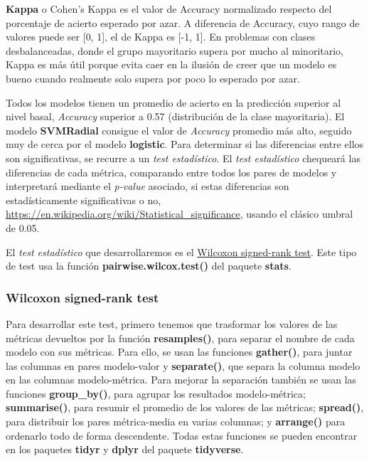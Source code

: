 \documentclass[]{article}
\begin{document}
\begin{tcolorbox}
	\textbf{Kappa} o Cohen's Kappa es el valor de Accuracy normalizado respecto
	del porcentaje de acierto esperado por azar. A diferencia de Accuracy,
	cuyo rango de valores puede ser {[}0, 1{]}, el de Kappa es {[}-1, 1{]}.
	En problemas con clases desbalanceadas, donde el grupo mayoritario
	supera por mucho al minoritario, Kappa es más útil porque evita caer en la
	ilusión de creer que un modelo es bueno cuando realmente solo supera por
	poco lo esperado por azar.
\end{tcolorbox}

Todos los modelos tienen un promedio de acierto en la predicción
superior al nivel basal, \emph{Accuracy} superior a 0.57 (distribución de la clase mayoritaria). El modelo
\textbf{SVMRadial} consigue el valor de \emph{Accuracy} promedio más alto,
seguido muy de cerca por el modelo \textbf{logistic}. Para determinar si
las diferencias entre ellos son significativas, se recurre a un
\emph{test estadístico}. El \emph{test
estadístico} chequeará las
diferencias de cada métrica, comparando entre todos los pares de
modelos y interpretará mediante el \emph{p-value} asociado, si
estas diferencias son estadísticamente significativas o no,
\url{https://en.wikipedia.org/wiki/Statistical_significance}, usando el clásico umbral de 0.05.

El \emph{test estadístico} que desarrollaremos es el
\href{https://www.cienciadedatos.net/documentos/18_prueba_de_los_rangos_con_signo_de_wilcoxon}{\color{blue}Wilcoxon
signed-rank test}. Este tipo de test usa la función \textbf{pairwise.wilcox.test()} del paquete \textbf{stats}.

\hypertarget{wilcoxon-signed-rank-test}{%
\subsubsection{Wilcoxon signed-rank
test}\label{wilcoxon-signed-rank-test}}

Para desarrollar este test, primero tenemos que trasformar los valores de las métricas devueltos por la función \textbf{resamples()}, para separar el nombre de cada modelo con sus métricas. Para ello, se usan las funciones \textbf{gather()}, para juntar las columnas en pares modelo-valor y \textbf{separate()}, que separa la columna modelo en las columnas modelo-métrica. Para mejorar la separación también se usan las funciones \textbf{group\_by()}, para agrupar los resultados modelo-métrica; \textbf{summarise()}, para resumir el promedio de los valores de las métricas; \textbf{spread()}, para distribuir los pares métrica-media en varias columnas; y \textbf{arrange()} para ordenarlo todo de forma descendente. Todas estas funciones se pueden encontrar en los paquetes \textbf{tidyr} y \textbf{dplyr} del paquete \textbf{tidyverse}.
\end{document}
